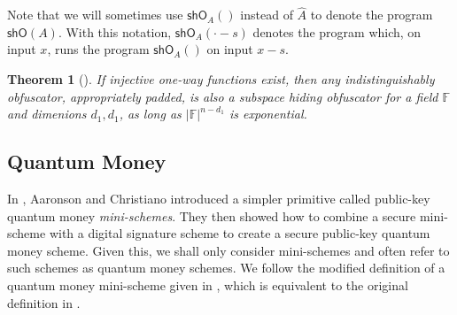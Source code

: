 \documentclass[12pt,letterpaper]{article}
\newtheorem{theorem}{Theorem}[section]
\theoremstyle{definition}
\theoremstyle{remark}
\begin{document}
Note that we will sometimes use $\textsf{shO}_A()$ instead of $\hat{A}$ to denote the program $\textsf{shO}(A)$. With this notation, $\textsf{shO}_A(\cdot - s)$ denotes the program which, on input $x$, runs the program $\textsf{shO}_A()$ on input $x-s$.

\begin{theorem}[\cite{Zha19}]
\label{shOconstruction}
    If injective one-way functions exist, then any indistinguishably obfuscator, appropriately padded, is also a subspace hiding obfuscator for a field $\mathbb{F}$ and dimenions $d_1,d_1$, as long as $|\mathbb{F}|^{n-d_1}$ is exponential.
\end{theorem}


\subsection{Quantum Money}

In \cite{AC12}, Aaronson and Christiano introduced a simpler primitive called public-key quantum money \emph{mini-schemes}. They then showed how to combine a secure mini-scheme with a digital signature scheme to create a secure public-key quantum money scheme. Given this, we shall only consider mini-schemes and often refer to such schemes as quantum money schemes. We follow the modified definition of a quantum money mini-scheme given in \cite{Zha19}, which is equivalent to the original definition in \cite{AC12}.
\end{document}
